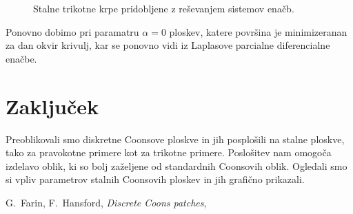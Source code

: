 \documentclass[a4paper,12pt]{article}
\begin{document}
\begin{figure}[ht!]
   \centering
   
   \caption{Stalne trikotne krpe pridobljene z reševanjem sistemov enačb.}
\label{fig:trikotne}
\end{figure}

Ponovno dobimo pri paramatru $\alpha = 0$ ploskev, 
katere površina je minimizeranan za dan okvir krivulj, kar se ponovno vidi iz 
Laplasove parcialne diferencialne enačbe.

\section{Zaključek}

Preoblikovali smo diskretne Coonsove ploskve in jih posplošili na stalne
ploskve, tako za pravokotne primere kot za trikotne primere. Poslošitev nam omogoča
izdelavo oblik, ki so bolj zaželjene od standardnih Coonsovih oblik. Ogledali smo 
si vpliv parametrov stalnih Coonsovih ploskev in jih grafično prikazali.


\newpage



\begin{thebibliography}{99}
   G.~Farin, F.~Hansford, \emph{Discrete Coons patches}, 
\end{thebibliography}
\end{document}

